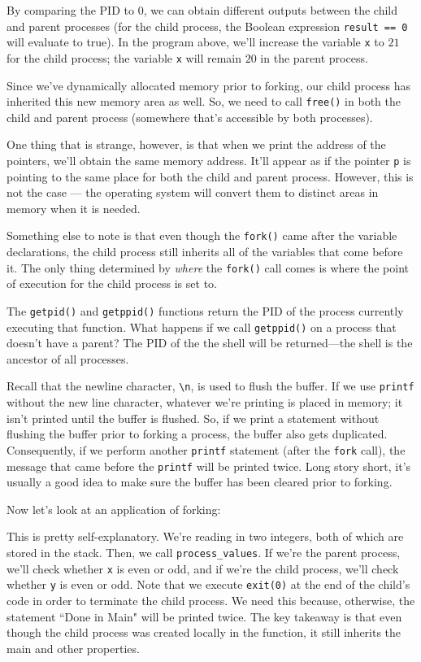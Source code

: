 By comparing the PID to $0$, we can obtain different outputs between the child and parent processes (for the child process, the Boolean expression \verb!result == 0! will evaluate to true). In the program above, we'll increase the variable \verb!x! to $21$ for the child process; the variable \verb!x! will remain $20$ in the parent process. 


Since we've dynamically allocated memory prior to forking, our child process has inherited this new memory area as well. So, we need to call \verb!free()! in both the child and parent process (somewhere that's accessible by both processes). 

One thing that is strange, however, is that when we print the address of the pointers, we'll obtain the same memory address. It'll appear as if the pointer \verb!p! is pointing to the same place for both the child and parent process. However, this is not the case --- the operating system will convert them to distinct areas in memory when it is needed.


Something else to note is that even though the \verb!fork()! came after the variable declarations, the child process still inherits all of the variables that come before it. The only thing determined by \textit{where} the \verb!fork()! call comes is where the point of execution for the child process is set to.


The \verb!getpid()! and \verb!getppid()! functions return the PID of the process currently executing that function. What happens if we call \verb!getppid()! on a process that doesn't have a parent? The PID of the the shell will be returned---the shell is the ancestor of all processes.


Recall that the newline character, \verb!\n!, is used to flush the buffer. If we use \verb!printf! without the new line character, whatever we're printing is placed in memory; it isn't printed until the buffer is flushed. So, if we print a statement without flushing the buffer prior to forking a process, the buffer also gets duplicated. Consequently, if we perform another \verb!printf! statement (after the \verb!fork! call), the message that came before the \verb!printf! will be printed twice. Long story short, it's usually a good idea to make sure the buffer has been cleared prior to forking. 


Now let's look at an application of forking: 

\lstset{
caption=Forking 3
}
\begin{center}
\label{Forking Example 3}
\end{center}

This is pretty self-explanatory. We're reading in two integers, both of which are stored in the stack. Then, we call \verb!process_values!. If we're the parent process, we'll check whether \verb!x! is even or odd, and if we're the child process, we'll check whether \verb!y! is even or odd. Note that we execute \verb!exit(0)! at the end of the child's code in order to terminate the child process. We need this because, otherwise, the statement ``Done in Main" will be printed twice. The key takeaway is that even though the child process was created locally in the function, it still inherits the main and other properties.
